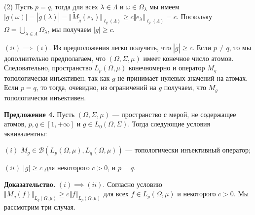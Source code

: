 \documentclass[11pt,twoside]{article}
\begin{document}
        (2) Пусть $p=q$, тогда для всех $\lambda\in\Lambda$ и
    $\omega\in\Omega_\lambda$ мы имеем $|g(\omega)|=|\widetilde{g}(\lambda)|
    =\Vert \widetilde{M}_{\widetilde{g}}(e_\lambda)\Vert_{\ell_q(\Lambda)} \geq
    c\Vert e_\lambda\Vert_{\ell_p(\Lambda)} =c$. Поскольку
    $\Omega=\bigcup_{\lambda\in\Lambda}\Omega_\lambda$, мы получаем $|g|\geq c$.

    $(ii)$$\implies$$ (i)$. Из предположения легко получить, что
    $|\widetilde{g}|\geq c$. Если $p\neq q$, то мы дополнительно предполагаем,
        что $(\Omega,\Sigma,\mu)$ имеет конечное число атомов. Следовательно,
        пространство $L_p(\Omega,\mu)$ конечномерно и оператор $M_g$ топологически
        инъективен, так как $g$ не принимает нулевых значений на атомах. Если $p=q$,
        то тогда, очевидно, из ограничений на $g$ получаем, что $M_{g}$
        топологически инъективен.


        \textbf{Предложение 4.} Пусть $(\Omega,\Sigma,\mu)$ --- пространство с
        мерой, не содержащее атомов, $p,q\in[1,+\infty]$ и $g\in
    L_0(\Omega,\Sigma)$. Тогда следующие условия эквивалентны:

    $(i)$ $M_g\in\mathcal{B}(L_p(\Omega,\mu),L_q(\Omega,\mu))$ --- топологически
        инъективный оператор;

    $(ii)$ $|g|\geq c$ для некоторого $c>0$, и $p=q$.


        \textbf{Доказательство.} $(i)$$\implies$$ (ii)$. Согласно условию $\Vert
    M_g(f)\Vert_{L_q(\Omega,\mu)}\geq c\Vert f\Vert_{L_p(\Omega,\mu)}$ для всех
    $f\in L_p(\Omega,\mu)$ и некоторого $c>0$. Мы рассмотрим три случая.
\end{document}
